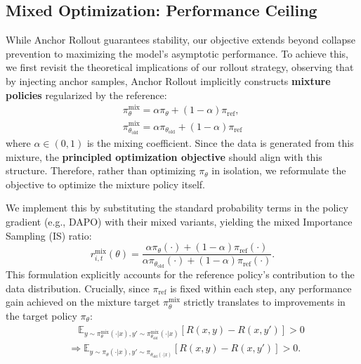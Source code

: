 \subsection{Mixed Optimization: Performance Ceiling}
While Anchor Rollout guarantees stability, our objective extends beyond collapse prevention to maximizing the model's asymptotic performance.
To achieve this, we first revisit the theoretical implications of our rollout strategy, observing that by injecting anchor samples, Anchor Rollout implicitly constructs \textbf{mixture policies} regularized by the reference:
\begin{equation}
\begin{gathered}
\pi^{\text{mix}}_\theta = \alpha\pi_\theta + (1-\alpha)\pi_{\text{ref}},\\
\pi^{\text{mix}}_{\theta_\text{old}} = \alpha\pi_{\theta_\text{old}} + (1-\alpha)\pi_{\text{ref}}
\end{gathered}
\end{equation}
where $\alpha \in (0, 1)$ is the mixing coefficient.
Since the data is generated from this mixture, the \textbf{principled optimization objective} should align with this structure.
Therefore, rather than optimizing $\pi_\theta$ in isolation, we reformulate the objective to optimize the mixture policy itself.

We implement this by substituting the standard probability terms in the policy gradient (e.g., DAPO) with their mixed variants, yielding the mixed Importance Sampling (IS) ratio:
\begin{equation}\label{eqn:mixed_is}
r_{i,t}^\text{mix}(\theta) = \frac{\alpha\pi_\theta(\cdot) + (1-\alpha)\pi_{\text{ref}}(\cdot)}{\alpha\pi_{\theta_{\text{old}}}(\cdot) + (1-\alpha)\pi_{\text{ref}}(\cdot)}.
\end{equation}
This formulation explicitly accounts for the reference policy's contribution to the data distribution.
Crucially, since $\pi_\text{ref}$ is fixed within each step, any performance gain achieved on the mixture target $\pi^{\text{mix}}_\theta$ strictly translates to improvements in the target policy $\pi_\theta$:
\begin{align*}
&\quad\mathbb E_{y\sim\pi_{\theta}^\text{mix}(\cdot|x), y'\sim\pi_{\theta_\text{old}}^\text{mix}(\cdot|x)}
[R(x,y) - R(x,y')] > 0 \\
&\Rightarrow \mathbb E_{y\sim\pi_{\theta}(\cdot|x), y'\sim\pi_{\theta_\text{old}(\cdot|x)}}
[R(x,y) - R(x,y')] > 0.
\end{align*}

